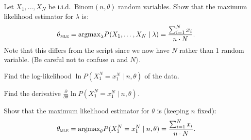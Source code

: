 \documentclass[a4paper,10pt,landscape,twocolumn]{scrartcl}
\begin{document}

\begin{exercise}
  Let $X_1, \dots, X_N$ be i.i.d.\ $\text{Binom}(n, \theta)$ random variables. 
  Show that the maximum likelihood estimator for $\lambda$ is:
  \[
    \theta_\textsc{mle} 
      = \text{argmax}_\lambda P(X_1, \dots, X_N \mid \lambda)
      = \frac{\sum_{i=1}^N x_i}{n \cdot N}.
  \] 
  Note that this differs from the script since we now have $N$ rather than 1
  random variable. (Be careful not to confuse $n$ and $N$).
  
  \begin{subex}
    Find the log-likelihood $\ln P(X_1^N=x_1^N \mid n, \theta)$ of the data.
  \end{subex}
  
  \begin{subex}
    Find the derivative 
    $\frac{\partial}{\partial \theta} \ln P(X_1^N=x_1^N \mid n, \theta)$.
  \end{subex}
  
  \begin{subex}
    Show that the maximum likelihood estimator for $\theta$ is (keeping $n$
    fixed):
    \[
      \theta_\textsc{mle} 
        = \text{argmax}_\theta P(X_1^N=x_1^N \mid n, \theta) 
        = \frac{\sum_{i=1}^N x_i}{n \cdot N}.
    \] 
  \end{subex}

\end{exercise}

\vfill\creditspracticequestions
\end{document}
